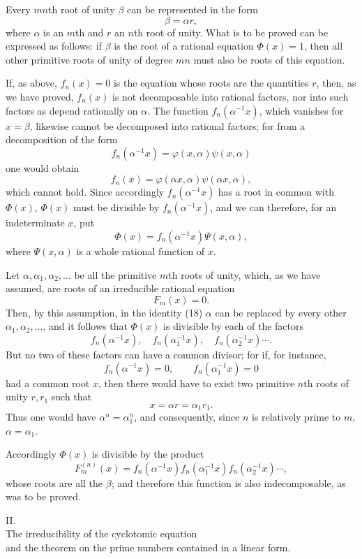 \documentclass[11pt]{article}
\begin{document}
Every $mn$th root of unity $\beta$ can be represented in the form
\[
\beta=\alpha r,
\]
where $\alpha$ is an $m$th and $r$ an $n$th root of unity. What is to be proved can be expressed as follows: if $\beta$ is the root of a rational equation $\Phi(x)=1$, then all other primitive roots of unity of degree $mn$ must also be roots of this equation.

If, as above, $f_n(x)=0$ is the equation whose roots are the quantities $r$, then, as we have proved, $f_n(x)$ is not decomposable into rational factors, nor into such factors as depend rationally on $\alpha$. The function $f_n(\alpha^{-1}x)$, which vanishes for $x=\beta$, likewise cannot be decomposed into rational factors; for from a decomposition of the form
\[
f_n(\alpha^{-1}x)=\varphi(x,\alpha)\psi(x,\alpha)
\]
one would obtain
\[
f_n(x)=\varphi(\alpha x,\alpha)\psi(\alpha x,\alpha),
\]
which cannot hold. Since accordingly $f_n(\alpha^{-1}x)$ has a root
in common with $\Phi(x)$, $\Phi(x)$ must be divisible by $f_n(\alpha^{-1}x)$, and we can therefore, for an indeterminate $x$, put
\begin{equation}\tag{18}
\Phi(x)=f_n(\alpha^{-1}x)\Psi(x,\alpha),
\end{equation}
where $\Psi(x,\alpha)$ is a whole rational function of $x$.

Let $\alpha,\alpha_1,\alpha_2,\ldots$ be all the primitive $m$th roots of unity, which, as we have assumed, are roots of an irreducible rational equation
\[
F_m(x)=0.
\]
Then, by this assumption, in the identity (18) $\alpha$ can be replaced by every other $\alpha_1,\alpha_2,\ldots$, and it follows that $\Phi(x)$ is divisible by each of the factors
\[
f_n(\alpha^{-1}x),\quad f_n(\alpha_1^{-1}x),\quad f_n(\alpha_2^{-1}x)\cdots .
\]
But no two of these factors can have a common divisor; for if, for instance,
\[
f_n(\alpha^{-1}x)=0,
\qquad
f_n(\alpha_1^{-1}x)=0
\]
had a common root $x$, then there would have to exist two primitive $n$th roots of unity $r,r_1$ such that
\[
x=\alpha r=\alpha_1r_1.
\]
Thus one would have $\alpha^n=\alpha_1^n$, and consequently, since $n$ is relatively prime to $m$, $\alpha=\alpha_1$.

Accordingly $\Phi(x)$ is divisible by the product
\[
F_m^{(n)}(x)=f_n(\alpha^{-1}x)f_n(\alpha_1^{-1}x)f_n(\alpha_2^{-1}x)\cdots,
\]
whose roots are all the $\beta$; and therefore this function is also indecomposable, as was to be proved.

\begin{center}
{\large II.}\\[0.5em]
{\large The irreducibility of the cyclotomic equation\\
and the theorem on the prime numbers contained in a linear form.}
\end{center}
\end{document}
